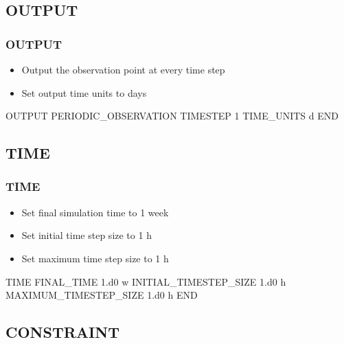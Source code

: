 \documentclass{beamer}
\begin{document}
\subsection{OUTPUT}

\begin{frame}[fragile]\frametitle{OUTPUT}

\begin{itemize}
\item Output the observation point at every time step
\item Set output time units to days
\end{itemize}


\begin{semiverbatim}

OUTPUT
  PERIODIC_OBSERVATION TIMESTEP 1
  TIME_UNITS d
END
\end{semiverbatim}

\end{frame}

\subsection{TIME}

\begin{frame}[fragile]\frametitle{TIME}

\begin{itemize}
\item Set final simulation time to 1 week
\item Set initial time step size to 1 h
\item Set maximum time step size to 1 h
\end{itemize}


\begin{semiverbatim}


TIME
  FINAL_TIME 1.d0 w
  INITIAL_TIMESTEP_SIZE 1.d0 h
  MAXIMUM_TIMESTEP_SIZE 1.d0 h
END
\end{semiverbatim}

\end{frame}

\subsection{CONSTRAINT}
\end{document}
